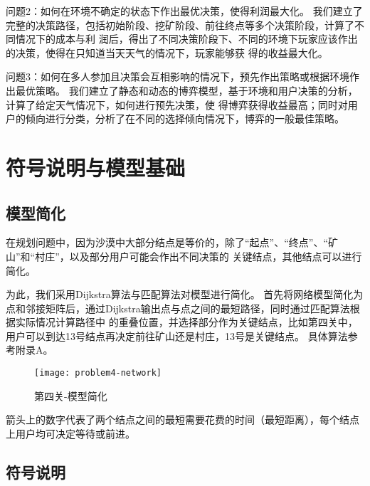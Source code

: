 \documentclass[withoutpreface,bwprint]{cumcmthesis} %
\begin{document}
问题2：如何在环境不确定的状态下作出最优决策，使得利润最大化。
我们建立了完整的决策路径，包括初始阶段、挖矿阶段、前往终点等多个决策阶段，计算了不同情况下的成本与利
润后，得出了不同决策阶段下、不同的环境下玩家应该作出的决策，使得在只知道当天天气的情况下，玩家能够获
得的收益最大化。

问题3：如何在多人参加且决策会互相影响的情况下，预先作出策略或根据环境作出最优策略。
我们建立了静态和动态的博弈模型，基于环境和用户决策的分析，计算了给定天气情况下，如何进行预先决策，使
得博弈获得收益最高；同时对用户的倾向进行分类，分析了在不同的选择倾向情况下，博弈的一般最佳策略。


\section{符号说明与模型基础}
\label{sec:simulate}

\subsection{模型简化}
\label{subsec:shortest}

在规划问题中，因为沙漠中大部分结点是等价的，除了“起点”、“终点”、“矿山”和“村庄”，以及部分用户可能会作出不同决策的
关键结点，其他结点可以进行简化。

为此，我们采用Dijkstra算法与匹配算法对模型进行简化。
首先将网络模型简化为点和邻接矩阵后，通过Dijkstra输出点与点之间的最短路径，同时通过匹配算法根据实际情况计算路径中
的重叠位置，并选择部分作为关键结点，比如第四关中，用户可以到达13号结点再决定前往矿山还是村庄，13号是关键结点。
具体算法参考附录A。

\begin{figure}[!h]
    \centering
    \texttt{[image: problem4-network]}
    \caption{第四关-模型简化}
    \label{fig:problem4-network}
\end{figure}

箭头上的数字代表了两个结点之间的最短需要花费的时间（最短距离），每个结点上用户均可决定等待或前进。


\subsection{符号说明}

\end{document}
